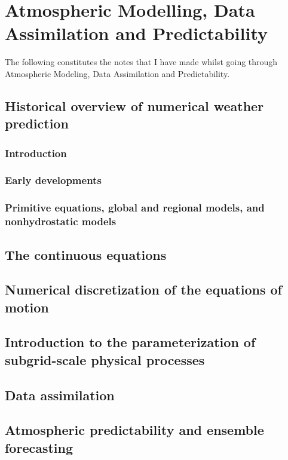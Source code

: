 \chapter{Atmospheric Modelling, Data Assimilation and Predictability}
\label{ch:kalnay}

The following constitutes the notes that I have made whilst going through Atmospheric Modeling, Data Assimilation and Predictability\citep{kalnay_atmospheric_2003}.

\section{Historical overview of numerical weather prediction}
\label{sec:kalnay:historical_overview}

\subsection{Introduction}
\label{subs:historical_overview:introduction}

\subsection{Early developments}
\label{subs:historical_overview:early_developments}

\subsection{Primitive equations, global and regional models, and nonhydrostatic models}
\label{subs:historical_overview:primitive_equations}

\section{The continuous equations}
\label{sec:kalnay:continuous_equations}

\section{Numerical discretization of the equations of motion}
\label{sec:kalnay:numerical_discretization}

\section{Introduction to the parameterization of subgrid-scale physical processes}
\label{sec:kalnay:parameterization}

\section{Data assimilation}
\label{sec:kalnay:data_assimilation}

\section{Atmospheric predictability and ensemble forecasting}
\label{sec:kalnay:predictability}
